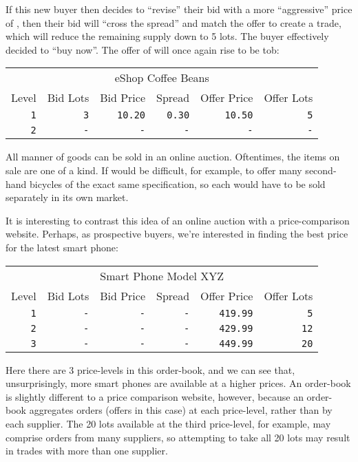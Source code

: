 \documentclass[11pt,a4paper]{article}
\newcommand{\s}{\textsterling}
\begin{document}
If this new buyer then decides to ``revise'' their \gls{bid} with a more ``aggressive'' price of
\s10.50, then their \gls{bid} will ``cross the \gls{spread}'' and match the \gls{offer} to create a
trade, which will reduce the remaining supply down to 5 \glspl{lot}. The buyer effectively decided
to ``buy now''. The \gls{offer} of \s10.20 will once again rise to be \gls{tob}:

\vspace{5mm}
\begin{tabular}{r|rrrrr}
\multicolumn{6}{c}{eShop Coffee Beans}\\
Level&Bid Lots&Bid Price&Spread&Offer Price&Offer Lots\\
\hline
\texttt{1}&\texttt{3}&\texttt{10.20}&\texttt{0.30}&\texttt{10.50}&\texttt{5}\\
\texttt{2}&\texttt{-}&\texttt{-}&\texttt{-}&\texttt{-}&\texttt{-}\\
\end{tabular}
\vspace{5mm}

All manner of goods can be sold in an online \gls{auction}. Oftentimes, the items on sale are one of
a kind. If would be difficult, for example, to \gls{offer} many second-hand bicycles of the exact
same specification, so each would have to be sold separately in its own \gls{market}.

It is interesting to contrast this idea of an online \gls{auction} with a price-comparison
website. Perhaps, as prospective buyers, we're interested in finding the best price for the latest
smart phone:

\vspace{5mm}
\begin{tabular}{r|rrrrr}
\multicolumn{6}{c}{Smart Phone Model XYZ}\\
Level&Bid Lots&Bid Price&Spread&Offer Price&Offer Lots\\
\hline
\texttt{1}&\texttt{-}&\texttt{-}&\texttt{-}&\texttt{419.99}&\texttt{5}\\
\texttt{2}&\texttt{-}&\texttt{-}&\texttt{-}&\texttt{429.99}&\texttt{12}\\
\texttt{3}&\texttt{-}&\texttt{-}&\texttt{-}&\texttt{449.99}&\texttt{20}\\
\end{tabular}
\vspace{5mm}

Here there are 3 \glspl{price-level} in this \gls{order-book}, and we can see that, unsurprisingly,
more smart phones are available at a higher prices. An \gls{order-book} is slightly different to a
price comparison website, however, because an \gls{order-book} aggregates \glspl{order}
(\glspl{offer} in this case) at each \gls{price-level}, rather than by each supplier. The 20
\glspl{lot} available at the third \gls{price-level}, for example, may comprise \glspl{order} from
many suppliers, so attempting to take all 20 \glspl{lot} may result in trades with more than one
supplier.
\end{document}

